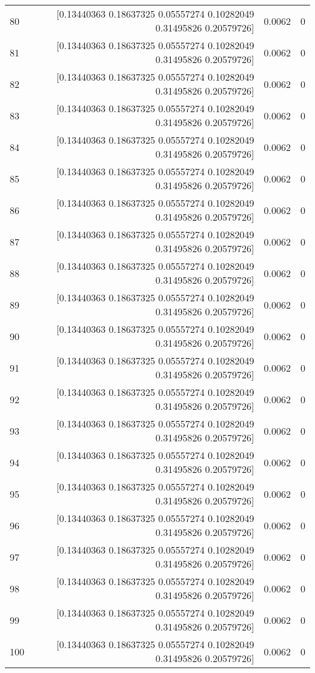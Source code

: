 \begin{longtable}{lrrr}
80 & [0.13440363 0.18637325 0.05557274 0.10282049 0.31495826 0.20579726] & 0.0062 & 0 \\
81 & [0.13440363 0.18637325 0.05557274 0.10282049 0.31495826 0.20579726] & 0.0062 & 0 \\
82 & [0.13440363 0.18637325 0.05557274 0.10282049 0.31495826 0.20579726] & 0.0062 & 0 \\
83 & [0.13440363 0.18637325 0.05557274 0.10282049 0.31495826 0.20579726] & 0.0062 & 0 \\
84 & [0.13440363 0.18637325 0.05557274 0.10282049 0.31495826 0.20579726] & 0.0062 & 0 \\
85 & [0.13440363 0.18637325 0.05557274 0.10282049 0.31495826 0.20579726] & 0.0062 & 0 \\
86 & [0.13440363 0.18637325 0.05557274 0.10282049 0.31495826 0.20579726] & 0.0062 & 0 \\
87 & [0.13440363 0.18637325 0.05557274 0.10282049 0.31495826 0.20579726] & 0.0062 & 0 \\
88 & [0.13440363 0.18637325 0.05557274 0.10282049 0.31495826 0.20579726] & 0.0062 & 0 \\
89 & [0.13440363 0.18637325 0.05557274 0.10282049 0.31495826 0.20579726] & 0.0062 & 0 \\
90 & [0.13440363 0.18637325 0.05557274 0.10282049 0.31495826 0.20579726] & 0.0062 & 0 \\
91 & [0.13440363 0.18637325 0.05557274 0.10282049 0.31495826 0.20579726] & 0.0062 & 0 \\
92 & [0.13440363 0.18637325 0.05557274 0.10282049 0.31495826 0.20579726] & 0.0062 & 0 \\
93 & [0.13440363 0.18637325 0.05557274 0.10282049 0.31495826 0.20579726] & 0.0062 & 0 \\
94 & [0.13440363 0.18637325 0.05557274 0.10282049 0.31495826 0.20579726] & 0.0062 & 0 \\
95 & [0.13440363 0.18637325 0.05557274 0.10282049 0.31495826 0.20579726] & 0.0062 & 0 \\
96 & [0.13440363 0.18637325 0.05557274 0.10282049 0.31495826 0.20579726] & 0.0062 & 0 \\
97 & [0.13440363 0.18637325 0.05557274 0.10282049 0.31495826 0.20579726] & 0.0062 & 0 \\
98 & [0.13440363 0.18637325 0.05557274 0.10282049 0.31495826 0.20579726] & 0.0062 & 0 \\
99 & [0.13440363 0.18637325 0.05557274 0.10282049 0.31495826 0.20579726] & 0.0062 & 0 \\
100 & [0.13440363 0.18637325 0.05557274 0.10282049 0.31495826 0.20579726] & 0.0062 & 0 \\

\end{longtable}
